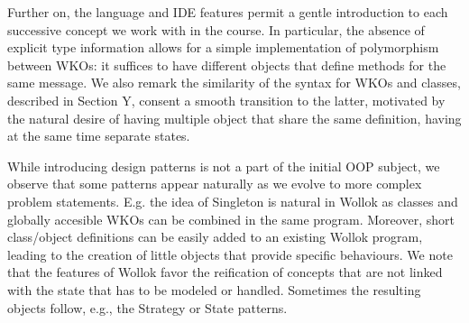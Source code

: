 Further on, the language and IDE features permit a gentle introduction to each successive concept we work with in the course. 
In particular, the absence of explicit type information allows for a simple implementation of polymorphism between WKOs: it suffices to have different objects that define methods for the same message.
We also remark the similarity of the syntax for WKOs and classes, described in Section Y, consent a smooth transition to the latter, motivated by the natural desire of having multiple object that share the same definition, having at the same time separate states.

While introducing design patterns is not a part of the initial OOP subject, we observe that some patterns appear naturally as we evolve to more complex problem statements. E.g. the idea of Singleton is natural in  Wollok as classes and globally accesible WKOs can be combined in the same program. Moreover, short class/object definitions can be easily added to an existing Wollok program, leading to the creation of little objects that provide specific behaviours. We note that the features of Wollok favor the reification of concepts that are not linked with the state that has to be modeled or handled. Sometimes the resulting objects follow, e.g., the Strategy or State\cite{Gamm93b} patterns.

